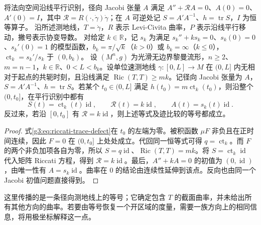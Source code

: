 \begin{proposition}\label{g3:prop:riccati-trace-rigidity}
	将法向空间沿线平行识别，径向 Jacobi 张量 \(A\) 满足 \(A''+\mathcal RA=0\)、\(A(0)=0\)、\(A'(0)=I\)，其中 \(\mathcal R=R(\cdot,\dot\gamma)\dot\gamma\)；在 \(A\) 可逆处记 \(S=A'A^{-1}\)、\(h=\operatorname{tr}S\)，\(I\) 为恒等算子。
	沿所述测地线，\(T=\dot\gamma\)，\(R\) 表示 Levi-Civita 曲率，\(P\) 表示沿线平行移动，撇号表示协变导数。
	对给定 \(k\in\mathbb R\)，记 \(s_k\) 为满足 \(s_k''+ks_k=0\)、\(s_k(0)=0\)、\(s_k'(0)=1\) 的模型函数，\(b_k=\pi/\sqrt k\)（\(k>0\)）或 \(b_k=\infty\)（\(k\le0\)），\(\operatorname{ct}_k=s_k'/s_k\) 于 \((0,b_k)\)。
	设 \((M^n,g)\) 为光滑无边界黎曼流形，\(n\ge2\)、\(m=n-1\)，\(k\in\mathbb R\)、\(0<L<b_k\)。设单位速测地线 \(\gamma:[0,L]\to M\) 在 \((0,L]\) 内无相对于起点的共轭时刻，且沿线满足 \(\operatorname{Ric}(T,T)\ge mk\)。记径向 Jacobi 张量为 \(A\)，\(S=A'A^{-1}\)、\(h=\operatorname{tr}S\)。若某个 \(t_0\in(0,L]\) 满足 \(h(t_0)=m\operatorname{ct}_k(t_0)\)，则沿整个 \((0,t_0]\)，在平行识别中都有
	\begin{equation}\label{g3:eq:riccati-trace-rigidity}
		S(t)=\operatorname{ct}_k(t)\operatorname{id},\qquad
		\mathcal R(t)=k\operatorname{id},\qquad A(t)=s_k(t)\operatorname{id}.
	\end{equation}
	反过来，若沿 \([0,t_0]\) 有 \(\mathcal R=k\operatorname{id}\)，则上述等式及迹比较的等号都成立。
\end{proposition}
\begin{proof}
	式\eqref{g3:eq:riccati-trace-defect}在 \(t_0\) 的左端为零。被积函数 \(\mu F\) 非负且在正时间连续，因此 \(F=0\) 在 \((0,t_0]\) 上处处成立。代回同一恒等式可得 \(q=\operatorname{ct}_k\)。而 \(F\) 的两个非负加项各自为零，所以 \(S=q\operatorname{id}\)、\(\operatorname{Ric}(T,T)=mk\)。将 \(S=\operatorname{ct}_k\operatorname{id}\) 代入矩阵 Riccati 方程，得到 \(\mathcal R=k\operatorname{id}\)。最后，\(A''+kA=0\) 的初值为 \((0,\operatorname{id})\)，由唯一性有 \(A=s_k\operatorname{id}\)。曲率在 \(0\) 的结论由连续性延伸到该点。反向也由同一个 Jacobi 初值问题直接得到。
\end{proof}

这里传播的是一条径向测地线上的等号；它确定包含 \(T\) 的截面曲率，并未给出所有其他方向的曲率。若要由等号恢复一个开区域的度量，需要一族方向上的相同信息，将用极坐标解释这一点。

